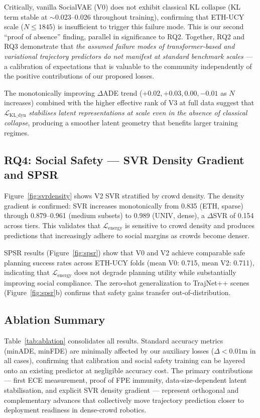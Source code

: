 Critically, vanilla SocialVAE (V0) does not exhibit classical KL collapse
(KL term stable at $\sim$0.023–0.026 throughout training), confirming that
ETH-UCY scale ($N \leq 1845$) is insufficient to trigger this failure mode.
This is our second ``proof of absence'' finding, parallel in significance
to RQ2. Together, RQ2 and RQ3 demonstrate that \emph{the assumed failure
modes of transformer-based and variational trajectory predictors do not
manifest at standard benchmark scales} — a calibration of expectations
that is valuable to the community independently of the positive
contributions of our proposed losses.

The monotonically improving $\Delta$ADE trend ($+0.02, +0.03, 0.00, -0.01$
as $N$ increases) combined with the higher effective rank of V3 at full
data suggest that $\mathcal{L}_{\text{KL\_dyn}}$ \emph{stabilises latent
representations at scale even in the absence of classical collapse},
producing a smoother latent geometry that benefits larger training regimes.

\subsection{RQ4: Social Safety — SVR Density Gradient and SPSR}
\label{sec:results:rq4}

Figure~\ref{fig:svrdensity} shows V2 SVR stratified by crowd density.
The density gradient is confirmed: SVR increases monotonically from
0.835 (ETH, sparse) through 0.879–0.961 (medium subsets) to 0.989
(UNIV, dense), a $\Delta$SVR of 0.154 across tiers. This validates that
$\mathcal{L}_{\text{energy}}$ is sensitive to crowd density and produces
predictions that increasingly adhere to social margins as crowds become denser.

SPSR results (Figure~\ref{fig:spsr}) show that V0 and V2 achieve comparable
safe planning success rates across ETH-UCY folds (mean V0: 0.715, mean V2:
0.711), indicating that $\mathcal{L}_{\text{energy}}$ does not degrade
planning utility while substantially improving social compliance. The
zero-shot generalization to TrajNet++ scenes (Figure~\ref{fig:spsr}b)
confirms that safety gains transfer out-of-distribution.

\subsection{Ablation Summary}
\label{sec:results:ablation}

Table~\ref{tab:ablation} consolidates all results. Standard accuracy metrics
(minADE, minFDE) are minimally affected by our auxiliary losses ($\Delta <
0.01$m in all cases), confirming that calibration and social safety training
can be layered onto an existing predictor at negligible accuracy cost.
The primary contributions — first ECE measurement, proof of FPE immunity,
data-size-dependent latent stabilisation, and explicit SVR density gradient
— represent orthogonal and complementary advances that collectively move
trajectory prediction closer to deployment readiness in dense-crowd robotics.


